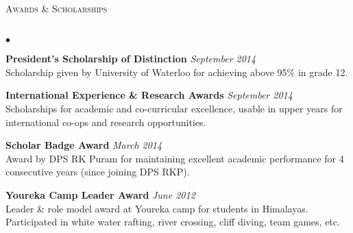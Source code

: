 \documentclass{article}
\newcommand{\lineunder}{\vspace*{-8pt} \\ \hspace*{-18pt} \hrulefill \\}
\newcommand{\header}[1]{{\hspace*{-15pt}\vspace*{6pt} \textsc{#1}} \vspace*{-6pt} \lineunder}
\newenvironment{achievements}{\begin{list}{$\bullet$}{\topsep 0pt \itemsep -1.5pt \leftmargin 5pt}}{\vspace*{4pt}\end{list}}
\begin{document}
\vspace{7pt}

\header{\normalsize Awards \& Scholarships}
\begin{achievements}
\item \textbf{President's Scholarship of Distinction} \hfill \textit {September 2014}
\\ Scholarship given by University of Waterloo for achieving above 95\% in grade 12.
\item \textbf{International Experience \& Research Awards} \hfill \textit {September 2014}
\\ Scholarships for academic and co-curricular excellence, usable in upper years for international co-ops and research opportunities.
\item \textbf{Scholar Badge Award} \hfill \textit {March 2014}
\\ Award by DPS RK Puram for maintaining excellent academic performance for 4 consecutive years (since joining DPS RKP).
\item \textbf{Youreka Camp Leader Award} \hfill \textit {June 2012}
\\ Leader \& role model award at Youreka camp for students in Himalayas. Participated in white water rafting, river crossing, cliff diving, team games, etc.
\end{achievements}
\end{document}
